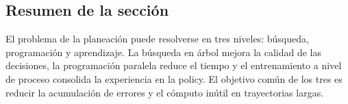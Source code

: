 \subsection{Resumen de la sección}

El problema de la planeación puede resolverse en tres niveles: búsqueda, programación y aprendizaje. La búsqueda en árbol mejora la calidad de las decisiones, la programación paralela reduce el tiempo y el entrenamiento a nivel de proceso consolida la experiencia en la policy. El objetivo común de los tres es reducir la acumulación de errores y el cómputo inútil en trayectorias largas.
